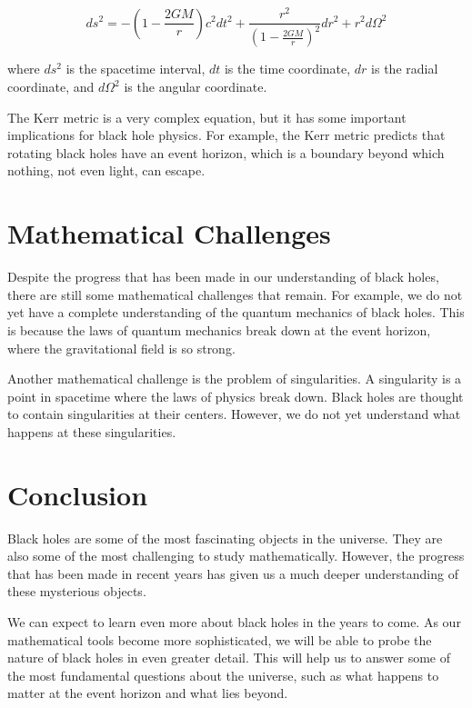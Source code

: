 \documentclass{article}
\begin{document}
$$ds^2 = -\left( 1 - \frac{2GM}{r} \right) c^2 dt^2 + \frac{r^2}{(1 - \frac{2GM}{r})^2} dr^2 + r^2 d\Omega^2$$

where $ds^2$ is the spacetime interval, $dt$ is the time coordinate, $dr$ is the radial coordinate, and $d\Omega^2$ is the angular coordinate.

The Kerr metric is a very complex equation, but it has some important implications for black hole physics. For example, the Kerr metric predicts that rotating black holes have an event horizon, which is a boundary beyond which nothing, not even light, can escape.

\section{Mathematical Challenges}

Despite the progress that has been made in our understanding of black holes, there are still some mathematical challenges that remain. For example, we do not yet have a complete understanding of the quantum mechanics of black holes. This is because the laws of quantum mechanics break down at the event horizon, where the gravitational field is so strong.

Another mathematical challenge is the problem of singularities. A singularity is a point in spacetime where the laws of physics break down. Black holes are thought to contain singularities at their centers. However, we do not yet understand what happens at these singularities.

\section{Conclusion}

Black holes are some of the most fascinating objects in the universe. They are also some of the most challenging to study mathematically. However, the progress that has been made in recent years has given us a much deeper understanding of these mysterious objects.

We can expect to learn even more about black holes in the years to come. As our mathematical tools become more sophisticated, we will be able to probe the nature of black holes in even greater detail. This will help us to answer some of the most fundamental questions about the universe, such as what happens to matter at the event horizon and what lies beyond.
\end{document}
